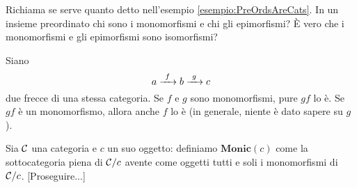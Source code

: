 \begin{esercizio}
Richiama se serve quanto detto nell'esempio \ref{esempio:PreOrdsAreCats}. In un insieme preordinato chi sono i monomorfismi e chi gli epimorfismi? È vero che i monomorfismi e gli epimorfismi sono isomorfismi?
\end{esercizio}

\begin{esercizio}
Siano
\[a \xrightarrow{\ f\ } b \xrightarrow{\ g\ } c\]
due frecce di una stessa categoria. Se \(f\) e \(g\) sono monomorfismi, pure \(gf\) lo è. Se \(gf\) è un monomorfismo, allora anche \(f\) lo è (in generale, niente è dato sapere su \(g\)).
\end{esercizio}

\begin{costruzione}
Sia \(\mathcal C\) una categoria e \(c\) un suo oggetto: definiamo \(\mathbf{Monic}(c)\) come la sottocategoria piena di \(\mathcal C/c\) avente come oggetti tutti e soli i monomorfismi di \(\mathcal C/c\). {\color{red} [Proseguire...]}
\end{costruzione}

